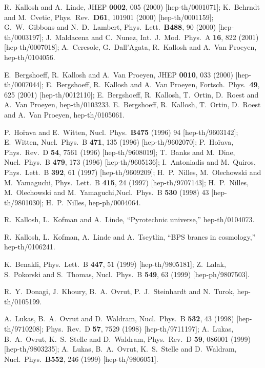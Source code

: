 \documentclass[a4paper,12pt]{article}
\begin{document}
\begin{thebibliography}{99}
R.~Kallosh and A.~Linde, JHEP {\bf   
0002}, 005 (2000) [hep-th/0001071]; K.~Behrndt and M.~Cvetic,  Phys.\ Rev.\   
{\bf D61}, 101901 (2000) [hep-th/0001159]; G.~W.~Gibbons and   
N.~D.~Lambert, Phys.\   
Lett.\  {\bf B488}, 90 (2000) [hep-th/0003197]; J.~Maldacena and C.~Nunez,   
Int.\ J.\ Mod.\ Phys.\ A {\bf 16}, 822 (2001)   
[hep-th/0007018]; A.~Ceresole, G.~Dall'Agata, R.~Kallosh and A.~Van   
Proeyen,
hep-th/0104056.   
   
E.~Bergshoeff, R.~Kallosh and A.~Van Proeyen,   
JHEP {\bf 0010}, 033 (2000) [hep-th/0007044]; E.~Bergshoeff, R.~Kallosh   
and A.~Van Proeyen, Fortsch.\   
Phys.\  {\bf 49}, 625 (2001) [hep-th/0012110]; E.~Bergshoeff, R.~Kallosh,   
T.~Ortin, D.~Roest and A.~Van Proeyen, hep-th/0103233. E.~Bergshoeff,   
R.~Kallosh, T.~Ortin, D.~Roest and A.~Van Proeyen, hep-th/0105061.   
   
   
\bibitem{HoravaWitten}   
P.~Ho\u{r}ava and E.~Witten,  Nucl.\ Phys.\  {\bf B475} (1996) 94   
[hep-th/9603142];  E.~Witten, Nucl.\ Phys.\ B {\bf 471}, 135 (1996)   
[hep-th/9602070]; P.~Ho\u{r}ava, Phys.\ Rev.\ D {\bf 54}, 7561 (1996)   
[hep-th/9608019];   
 T.~Banks and M.~Dine, Nucl.\ Phys.\ B {\bf 479}, 173 (1996) [hep-th/9605136];   
I.~Antoniadis and M.~Quiros,  
Phys.\ Lett.\ B {\bf 392}, 61 (1997) [hep-th/9609209]; H.~P.~Nilles,   
M.~Olechowski and M.~Yamaguchi, Phys.\ Lett.\ B {\bf 415}, 24 (1997) [hep-th/9707143];   
H.~P.~Nilles, M.~Olechowski and M.~Yamaguchi,Nucl.\ Phys.\ B {\bf 530} (1998) 43 [hep-th/9801030];   
H.~P.~Nilles, 
hep-ph/0004064.  

R.~Kallosh, L.~Kofman and A.~Linde, ``Pyrotechnic universe,''
hep-th/0104073.   

R.~Kallosh, L.~Kofman, A.~Linde and A.~Tseytlin,
``BPS branes in cosmology,''
hep-th/0106241.

K.~Benakli, Phys.\   
Lett.\ B {\bf 447}, 51 (1999) [hep-th/9805181]; Z.~Lalak, S.~Pokorski and   
S.~Thomas, 
Nucl.\ Phys.\ B {\bf 549}, 63 (1999) [hep-ph/9807503]. 
 
   
R.~Y.~Donagi, J.~Khoury, B.~A.~Ovrut, P.~J.~Steinhardt and N.~Turok,    
hep-th/0105199.   

   
 A.~Lukas, B.~A.~Ovrut and D.~Waldram,   
Nucl.\ Phys.\ B {\bf 532}, 43 (1998) [hep-th/9710208];   
Phys.\ Rev.\ D {\bf   
57}, 7529 (1998) [hep-th/9711197];
A.~Lukas, B.~A.~Ovrut, K.~S.~Stelle and D.~Waldram,    
Phys.\ Rev.\ D {\bf 59}, 086001 (1999) [hep-th/9803235]; A.~Lukas,   
B.~A.~Ovrut, K.~S.~Stelle and D.~Waldram, Nucl.\ Phys.\  {\bf B552}, 246 (1999) [hep-th/9806051].   
 


\end{thebibliography}
\end{document}
